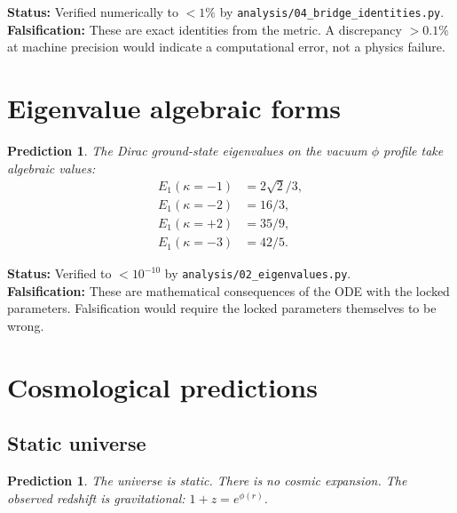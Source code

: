 \documentclass[11pt,letterpaper]{article}
\newtheorem{prediction}[theorem]{Prediction}
\numberwithin{equation}{section}
\begin{document}
\noindent\textbf{Status:} Verified numerically to $< 1\%$ by
\texttt{analysis/04\_bridge\_identities.py}.\\
\textbf{Falsification:} These are exact identities from the metric. A
discrepancy $> 0.1\%$ at machine precision would indicate a computational
error, not a physics failure.

\section{Eigenvalue algebraic forms}
\label{sec:eigenvalues}

\begin{prediction}
The Dirac ground-state eigenvalues on the vacuum $\phi$ profile take
algebraic values:
\begin{align}
  E_1(\kappa=-1) &= 2\sqrt{2}/3, \\
  E_1(\kappa=-2) &= 16/3, \\
  E_1(\kappa=+2) &= 35/9, \\
  E_1(\kappa=-3) &= 42/5.
\end{align}
\end{prediction}

\noindent\textbf{Status:} Verified to $< 10^{-10}$ by
\texttt{analysis/02\_eigenvalues.py}.\\
\textbf{Falsification:} These are mathematical consequences of the ODE
with the locked parameters. Falsification would require the locked
parameters themselves to be wrong.

\section{Cosmological predictions}
\label{sec:cosmology}

\subsection{Static universe}

\begin{prediction}
The universe is static. There is no cosmic expansion. The observed redshift
is gravitational: $1 + z = e^{\phi(r)}$.
\end{prediction}
\end{document}
